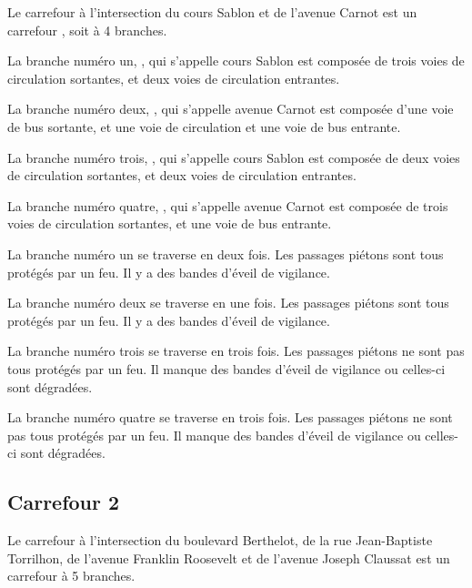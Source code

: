 \begin{appendix}
\label{annexe:q_ID56_carrefour1}

Le carrefour à l'intersection du cours Sablon et de l'avenue Carnot est un carrefour , soit à 4 branches.

\newpar{}

La branche numéro un, , qui s'appelle cours Sablon est composée de trois voies de circulation sortantes, et deux voies de circulation entrantes.

\newpar{}

La branche numéro deux, , qui s'appelle avenue Carnot est composée d'une voie de bus sortante, et une voie de circulation et une voie de bus entrante.

\newpar{}

La branche numéro trois, , qui s'appelle cours Sablon est composée de deux voies de circulation sortantes, et deux voies de circulation entrantes.

\newpar{}

La branche numéro quatre, ,  qui s'appelle avenue Carnot est composée de trois voies de circulation sortantes, et une voie de bus entrante.

\newpar{}

La branche numéro un se traverse en deux fois. Les passages piétons sont tous protégés par un feu. Il y a des bandes d'éveil de vigilance.

\newpar{}

La branche numéro deux se traverse en une fois. Les passages piétons sont tous protégés par un feu. Il y a des bandes d'éveil de vigilance.

\newpar{}

La branche numéro trois se traverse en trois fois. Les passages piétons ne sont pas tous protégés par un feu. Il manque des bandes d'éveil de vigilance ou celles-ci sont dégradées.

\newpar{}

La branche numéro quatre se traverse en trois fois. Les passages piétons ne sont pas tous protégés par un feu. Il manque des bandes d'éveil de vigilance ou celles-ci sont dégradées.

\subsection*{Carrefour 2}

\label{annexe:q_ID56_carrefour2}

Le carrefour à l'intersection du boulevard Berthelot, de la rue Jean-Baptiste Torrilhon, de l'avenue Franklin Roosevelt et de l'avenue Joseph Claussat est un carrefour à 5 branches.


\end{appendix}
